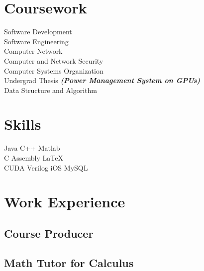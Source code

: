 \documentclass[]{deedy-resume-openfont}
\begin{document}
\begin{minipage}[t]{0.30\textwidth}
\section{Coursework}

Software Development \\
Software Engineering \\
Computer Network \\
Computer and Network Security \\
Computer Systems Organization \\
Undergrad Thesis {\footnotesize \textit{\textbf{(Power Management System on GPUs)}}} \\
Data Structure and Algorithm 
\sectionsep


\section{Skills}
Java \textbullet{}  C++ \textbullet{} Matlab \\
C \textbullet{}  Assembly \textbullet{} \LaTeX\ \\ 
CUDA \textbullet{} Verilog \textbullet{} iOS \textbullet{} MySQL
\sectionsep

%
\section{Work Experience} 
\subsection{Course Producer}

\subsection{Math Tutor for Calculus}
\sectionsep

%
%

\end{minipage} 
\end{document}

